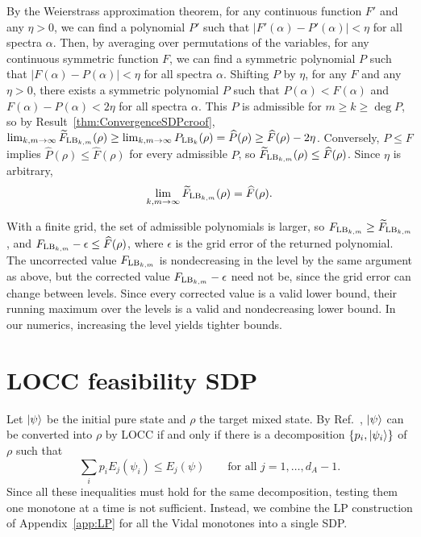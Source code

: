 \documentclass[aps,pra,twocolumn,showpacs,superscriptaddress,groupedaddress]{revtex4-2}
\renewcommand{\a}{\alpha}
\begin{document}
\begin{widetext}
By the Weierstrass approximation theorem, for any continuous function $F'$ and any $\eta>0$, we can find a polynomial $P'$ such that $|F'(\a)-P'(\a)| < \eta$ for all spectra $\a$. Then, by averaging over permutations of the variables, for any continuous symmetric function $F$, we can find a symmetric polynomial $P$ such that $|F(\a)-P(\a)| < \eta$ for all spectra $\a$.
Shifting $P$ by $\eta$, for any $F$ and any $\eta>0$, there exists a symmetric polynomial $P$ such that $P(\a) < F(\a)$ and $F(\a)-P(\a) < 2\eta$ for all spectra $\a$. This $P$ is admissible for $m\geq k\geq\deg P$, so by Result~\ref{thm:ConvergenceSDPcroof}, $\lim_{k,m\to\infty}\widetilde F_{{\rm LB}_{k,m}}(\rho)\geq\lim_{k,m\to\infty}P_{{\rm LB}_k}(\rho)=\widehat P(\rho)\geq\widehat F(\rho)-2\eta$. Conversely, $P\leq F$ implies $\widehat P(\rho)\leq\widehat F(\rho)$ for every admissible $P$, so $\widetilde F_{{\rm LB}_{k,m}}(\rho)\leq\widehat F(\rho)$. Since $\eta$ is arbitrary,
\begin{equation}
    \lim_{k,m\to\infty}\widetilde F_{{\rm LB}_{k,m}}(\rho)=\widehat F(\rho).
\end{equation}

With a finite grid, the set of admissible polynomials is larger, so $F_{{\rm LB}_{k,m}}\geq\widetilde F_{{\rm LB}_{k,m}}$, and $F_{{\rm LB}_{k,m}}-\epsilon\leq\widehat F(\rho)$, where $\epsilon$ is the grid error of the returned polynomial. The uncorrected value $F_{{\rm LB}_{k,m}}$ is nondecreasing in the level by the same argument as above, but the corrected value $F_{{\rm LB}_{k,m}}-\epsilon$ need not be, since the grid error can change between levels. Since every corrected value is a valid lower bound, their running maximum over the levels is a valid and nondecreasing lower bound. In our numerics, increasing the level yields tighter bounds.

\section{LOCC feasibility SDP}\label{app:LOCC}
Let $\ket{\psi}$ be the initial pure state and $\rho$ the target mixed state. By Ref.~\cite{Jonathan_1999}, $\ket{\psi}$ can be converted into $\rho$ by LOCC if and only if there is a decomposition $\{p_i,\ket{\psi_i}\}$ of $\rho$ such that
\begin{equation}\label{eq:LOCCcriterion}
    \sum_i p_i E_j(\psi_i)\leq E_j(\psi)\qquad\text{for all } j=1,\dots,d_A-1 .
\end{equation}
Since all these inequalities must hold for the same decomposition, testing them one monotone at a time is not sufficient. Instead, we combine the LP construction of Appendix~\ref{app:LP} for all the Vidal monotones into a single SDP.


\end{widetext}
\end{document}
